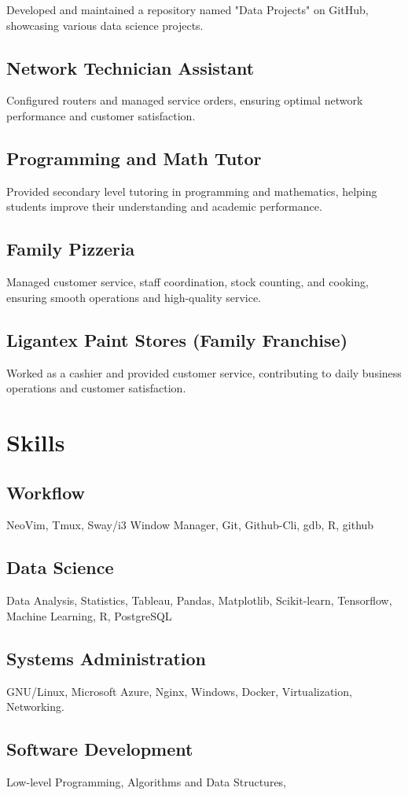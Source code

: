 \documentclass{article}
\begin{document}
Developed and maintained a repository named "Data Projects" on GitHub, showcasing various data science projects.
\subsection{Network Technician Assistant}
Configured routers and managed service orders, 
ensuring optimal network performance and customer satisfaction.
\subsection{Programming and Math Tutor}
Provided secondary level tutoring in programming and mathematics, helping students improve their understanding and academic performance.
\subsection{Family Pizzeria}
Managed customer service, staff coordination, stock counting, and cooking, ensuring smooth operations and high-quality service.
\subsection{Ligantex Paint Stores (Family Franchise)}
Worked as a cashier and provided customer service, contributing to daily business operations and customer satisfaction.

\section{Skills}
\subsection{Workflow}
NeoVim, Tmux, Sway/i3 Window Manager, Git, Github-Cli,
gdb, R, github
\subsection{Data Science}
Data Analysis, Statistics, Tableau, Pandas, Matplotlib, Scikit-learn, Tensorflow,
Machine Learning, R, PostgreSQL
\subsection{Systems Administration}
GNU/Linux, Microsoft Azure, Nginx, Windows,
Docker, Virtualization, Networking.
\subsection{Software Development}
Low-level Programming,
Algorithms and Data Structures,
\end{document}
